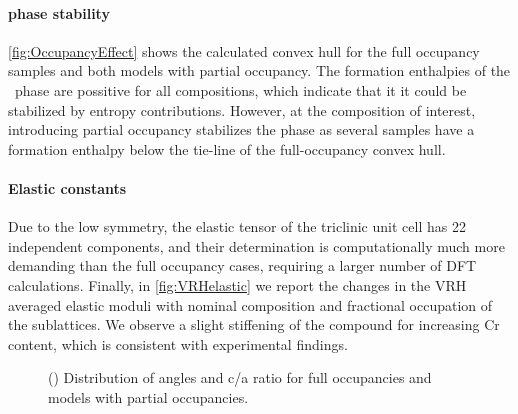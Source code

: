 \documentclass[superscriptaddress, 12pt]{revtex4-2}%
\begin{document}
\paragraph{phase stability}

\autoref{fig:OccupancyEffect} shows the calculated convex hull for the full occupancy samples and both models with
partial occupancy. 
The formation enthalpies of the \textsigma~phase are possitive for all compositions, which indicate that it it could be stabilized by entropy contributions. 
However, at the composition of interest, introducing partial occupancy stabilizes the phase as several samples have a formation enthalpy below the tie-line of the full-occupancy convex hull. 

\paragraph{Elastic constants}

Due to the low symmetry, the elastic tensor of the triclinic unit cell has 22 independent components, and their determination is computationally much more demanding than the full occupancy cases, requiring a larger number of DFT calculations.
Finally, in \autoref{fig:VRHelastic} we report the changes in the VRH averaged elastic moduli with nominal composition and fractional occupation of the sublattices.
We observe a slight stiffening of the compound for increasing Cr content, which is consistent with experimental findings.

\begin{figure}
  \caption{\protect\label{fig:SymmetryConsiderations}
    () 
    Distribution of angles and c/a ratio for full occupancies and models with partial occupancies. 
  }
\end{figure}
\end{document}
